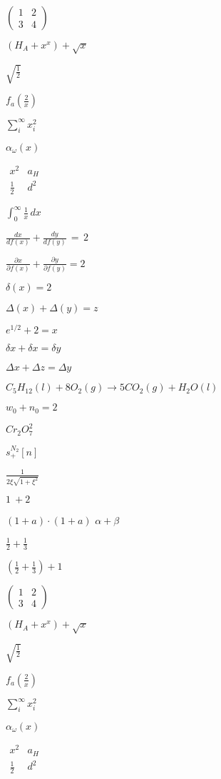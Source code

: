 \documentclass{article}
\begin{document}
$
\begin{pmatrix} 1 & 2 \\ 3 & 4
\end{pmatrix}$

$(H_A+x^x)+\sqrt{x}$

$\sqrt{\frac{1}{2}}$

$f_a(\frac{2}{x})$

$\sum_i^{\infty} x_i^2$

$\alpha_{\omega}(x)$

$
\begin{matrix} x^2 & a_H \\ \frac{1}{2} & d^2
\end{matrix}$

$\int_0^{\infty} \frac{1}{x}\, dx$

$\frac{dx}{df(x)} + \frac{dy}{df(y)}\, =\, 2$

$\frac{\partial x}{\partial f(x)} + \frac{\partial y}{\partial f(y)} = 2$

$\delta (x) = 2$

$\Delta (x) + \Delta (y) = z$

$e^{1/2} + 2 = x$

$\delta x + \delta x = \delta y$

$\Delta x + \Delta z = \Delta y$

$C_5H_{12}(l)+8O_2(g)\rightarrow 5CO_2(g)+H_2O(l)$

$w_0 + n_0 = 2$

$Cr_2O_7^2$

$s^{N_2}_+ [n]$

$\frac{1}{2\xi \sqrt{1+\xi^2}}$

$1\: + 2$

$(1 + a) \cdot (1 + a)$
$\alpha + \beta$

$\frac{1}{2} + \frac{1}{3}$

$(\frac{1}{2} + \frac{1}{3}) + 1$

$
\begin{pmatrix} 1 & 2 \\ 3 & 4
\end{pmatrix}$

$(H_A+x^x)+\sqrt{x}$

$\sqrt{\frac{1}{2}}$

$f_a(\frac{2}{x})$

$\sum_i^{\infty} x_i^2$

$\alpha_{\omega}(x)$

$
\begin{matrix} x^2 & a_H \\ \frac{1}{2} & d^2
\end{matrix}$
\end{document}
